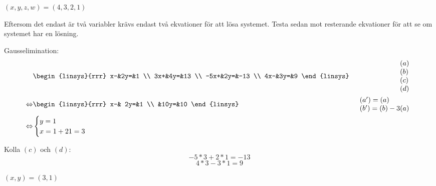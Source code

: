 \begin{task}{1.7}
	\ans $(x,y,z,w)=(4,3,2,1)$
\end{task}

\begin{task}{1.8}
	Eftersom det endast är två variabler krävs endast två ekvationer för att lösa systemet. Testa sedan mot resterande ekvationer för att se om systemet har en lösning.
	
	Gausselimination:
	\begin{align*}
		&\begin{linsys}{rrr}
			  x-&2y=&1 \\
			 3x+&4y=&13 \\
			-5x+&2y=&-13 \\
			 4x-&3y=&9
		\end{linsys}
		&\begin{array}{l} 
			(a) \\ 
			(b) \\
			(c) \\
			(d)
		\end{array} \\ \lra
		&\begin{linsys}{rrr}
			x-& 2y=&1 \\
			  &10y=&10
		\end{linsys}
		&\begin{array}{l} 
			(a')=(a) \\ 
			(b')=(b)-3(a)
		\end{array} \\ \lra
		&\begin{cases}
			y=1 \\
			x=1+2\*1=3
		\end{cases}
	\end{align*}

	Kolla $(c)$ och $(d)$:
	\[-5*3+2*1=-13\]
	\[4*3-3*1=9\]
	
	\ans $(x,y)=(3,1)$
\end{task}

